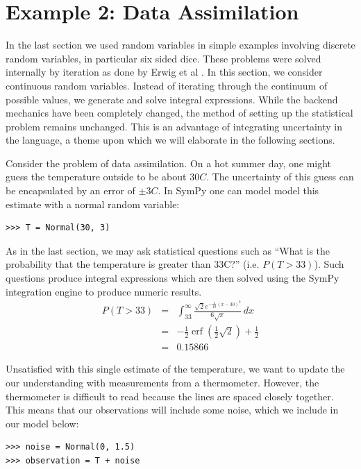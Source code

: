 \section{Example 2: Data Assimilation}

In the last section we used random variables in simple examples involving
discrete random variables, in particular six sided dice. These problems were
solved internally by iteration as done by Erwig et al \cite{Erwig2006}. In this
section, we consider continuous random variables. Instead of iterating through
the continuum of possible values, we generate and solve integral expressions.
 While the backend mechanics have been completely changed, the
method of setting up the statistical problem remains unchanged. This is an
advantage of integrating uncertainty in the language, a theme upon which we
will elaborate in the following sections.

Consider the problem of data assimilation. On a hot summer day, one might guess
the temperature outside to be about $30C$. The uncertainty of this guess can be
encapsulated by an error of $\pm3C$. In SymPy one can model model this estimate
with a normal random variable:

\begin{lstlisting}
>>> T = Normal(30, 3)
\end{lstlisting}

As in the last section, we may ask statistical questions such as ``What is the
probability that the temperature is greater than 33C?'' (i.e. $P(T>33)$). Such
questions produce integral expressions which are then solved using the SymPy
integration engine to produce numeric results.
\begin{eqnarray*}
P(T>33) & = & \int_{33}^{\infty} \frac{\sqrt{2} e^{- \frac{1}{18} \left(x -30\right)^{2}}}{6 \sqrt{\pi}}\, dx \\
& = & - \frac{1}{2} \operatorname{erf}{\left (\frac{1}{2} \sqrt{2} \right )} + \frac{1}{2} \\
& = & 0.15866
\end{eqnarray*}

Unsatisfied with this single estimate of the temperature, we want to update the
our understanding with measurements from a thermometer. However, the thermometer is difficult to read because the lines are spaced closely
together.  This means that our observations will include some noise, which we
include in our model below:

\begin{lstlisting}
>>> noise = Normal(0, 1.5)
>>> observation = T + noise
\end{lstlisting}

